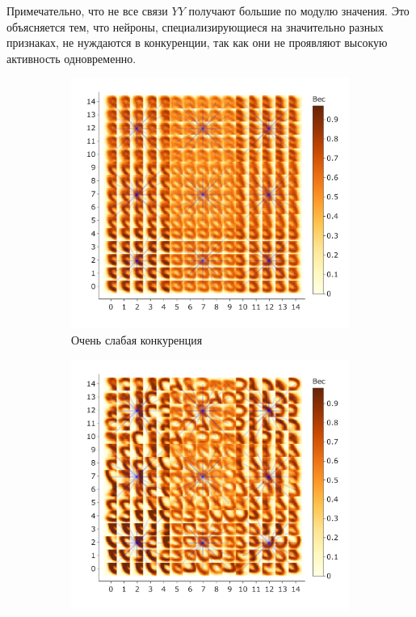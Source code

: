 \documentclass[a4paper]{article}
\begin{document}
Примечательно, что не все связи $YY$ получают большие по модулю значения. Это объясняется тем, что нейроны, специализирующиеся на значительно разных признаках, не нуждаются в конкуренции, так как они не проявляют высокую активность одновременно.

\begin{figure}[H]
\centering
\begin{subfigure}{0.45\textwidth} 
    \includegraphics[width=\textwidth,keepaspectratio=true]{competition_on_XY_worst_ru.pdf}
    \caption{Очень слабая конкуренция}
\end{subfigure}
\begin{subfigure}{0.45\textwidth}
    \includegraphics[width=\textwidth,keepaspectratio=true]{competition_on_XY_medium_bad_ru.pdf}

\end{subfigure}
\end{figure}
\end{document}
